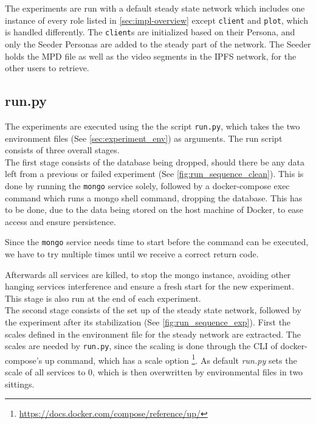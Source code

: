 The experiments are run with a default steady state network which includes one instance of every role listed in \autoref{sec:impl-overview} except \texttt{client} and \texttt{plot}, which is handled differently. The \texttt{client}s are initialized based on their Persona, and only the Seeder Personas are added to the steady part of the network.
The Seeder holds the \ac{MPD} file as well as the video segments in the \ac{IPFS} network, for the other users to retrieve. 






\subsection{run.py}
\label{sec:experiment_run}
The experiments are executed using the the script \texttt{run.py}, which takes the two environment files (See \autoref{sec:experiment_env}) as arguments. The run script consists of three overall stages.
\\


\noindent The first stage consists of the database being dropped, should there be any data left from a previous or failed experiment (See \autoref{fig:run_sequence_clean}). 
This is done by running the \texttt{mongo} service solely, followed by a docker-compose exec command which runs a mongo shell command, dropping the database. This has to be done, due to the data being stored on the host machine of Docker, to ease access and ensure persistence.

Since the \texttt{mongo} service needs time to start before the command can be executed, we have to try multiple times until  we receive a correct return code.

Afterwards all services are killed, to stop the mongo instance, avoiding other hanging services interference and ensure a fresh start for the new experiment. This stage is also run at the end of each experiment.
\\


\noindent The second stage consists of the set up of the steady state network, followed by the experiment after its stabilization (See \autoref{fig:run_sequence_exp}). First the scales defined in the environment file for the steady network are extracted. The scales are needed by \texttt{run.py}, since the scaling is done through the \ac{CLI} of docker-compose's up command, which has a scale option \footnote{\url{https://docs.docker.com/compose/reference/up/}}. As default \textit{run.py} sets the scale of all services to 0, which is then overwritten by environmental files in two sittings.

